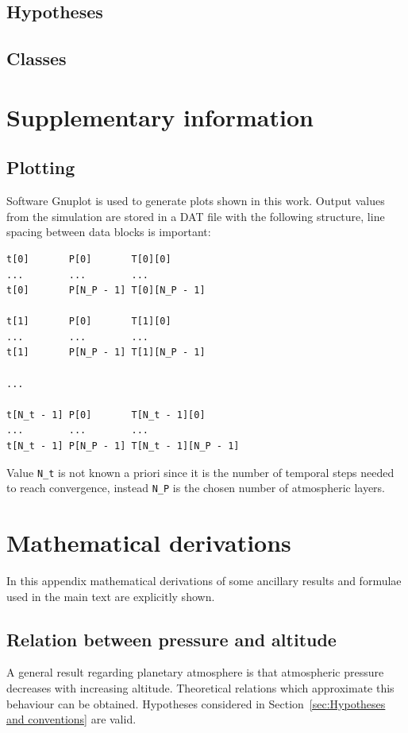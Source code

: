 \documentclass[a4paper,10pt,final,twocolumn]{article}
\begin{document}
\subsection{Hypotheses} %
\label{sec:Hypotheses}

\subsection{Classes}

\section{Supplementary information}

\subsection{Plotting}
\label{sec:Plotting}
Software Gnuplot is used to generate plots shown in this work. Output values from the simulation are stored in a DAT file with the following structure, line spacing between data blocks is important:
\begin{verbatim}
t[0]       P[0]       T[0][0]
...        ...        ...
t[0]       P[N_P - 1] T[0][N_P - 1]

t[1]       P[0]       T[1][0]
...        ...        ...
t[1]       P[N_P - 1] T[1][N_P - 1]

...

t[N_t - 1] P[0]       T[N_t - 1][0]
...        ...        ...
t[N_t - 1] P[N_P - 1] T[N_t - 1][N_P - 1]
\end{verbatim}
Value \verb|N_t| is not known a priori since it is the number of temporal steps needed to reach convergence, instead \verb|N_P| is the chosen number of atmospheric layers.

\section{Mathematical derivations}
In this appendix mathematical derivations of some ancillary results and formulae used in the main text are explicitly shown.

\subsection{Relation between pressure and altitude}
\label{sec:Relation between pressure and altitude}
A general result regarding planetary atmosphere is that atmospheric pressure decreases with increasing altitude. Theoretical relations which approximate this behaviour can be obtained. Hypotheses considered in Section~\ref{sec:Hypotheses and conventions} are valid.
\end{document}
